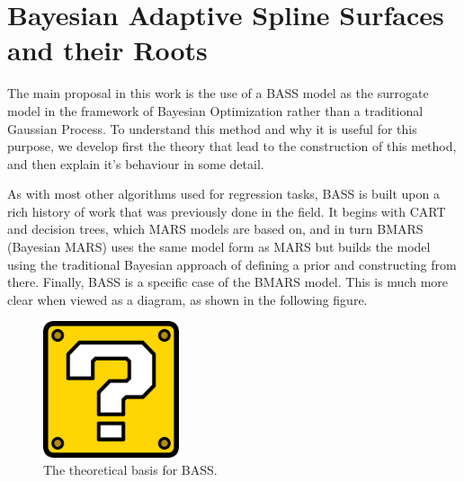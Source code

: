 \chapter{Bayesian Adaptive Spline Surfaces and their Roots}

The main proposal in this work is the use of a BASS model as the surrogate model in the framework of Bayesian Optimization rather than a traditional Gaussian Process. To understand this method and why it is useful for this purpose, we develop first the theory that lead to the construction of this method, and then explain it's behaviour in some detail. 

As with most other algorithms used for regression tasks, BASS is built upon a rich history of work that was previously done in the field. It begins with CART and decision trees, which MARS models are based on, and in turn BMARS (Bayesian MARS) uses the same model form as MARS but builds the model using the traditional Bayesian approach of defining a prior and constructing from there. Finally, BASS is a specific case of the BMARS model. This is much more clear when viewed as a diagram, as shown in the following figure. 

\begin{figure}[h]
	\includegraphics[width=4cm]{Figures/missing.png}
	\centering
	\caption{The theoretical basis for BASS.}
	\label{building_BASS}
\end{figure}


